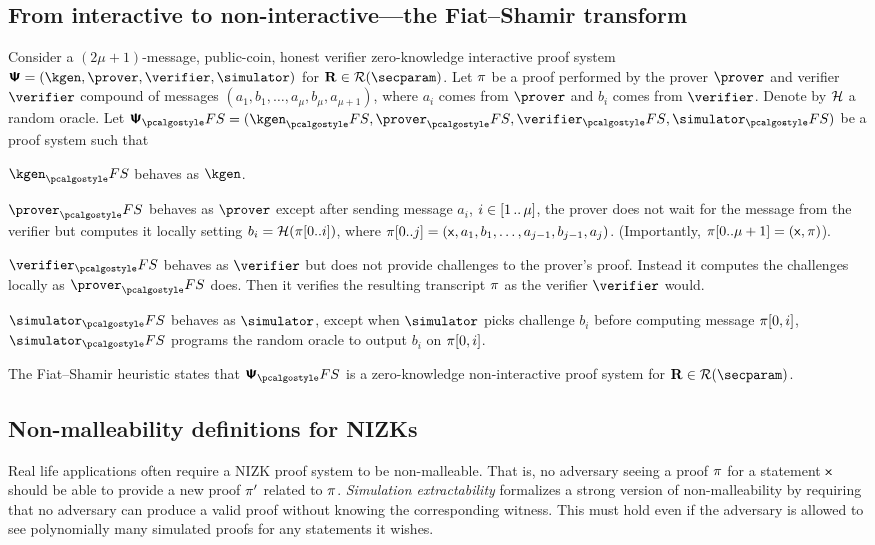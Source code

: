 \documentclass[runningheads,11pt]{llncs}
\begin{document}
\subsection{From interactive to non-interactive---the Fiat--Shamir transform}
Consider a $(2\mu + 1)$-message, public-coin, honest verifier zero-knowledge
interactive proof system
$\proofsystem = (\kgen, \prover, \verifier, \simulator)$ for
$\REL \in \RELGEN(\secparam)$.  Let $\pi$ be a proof performed by the
prover $\prover$ and verifier $\verifier$ compound of messages
$(a_1, b_1, \ldots, a_{\mu}, b_{\mu}, a_{\mu + 1})$, where $a_i$ comes from
$\prover$ and $b_i$ comes from $\verifier$.  Denote by $\mathcal{H}$ a random oracle.
Let $\proofsystem_\fs = (\kgen_\fs, \prover_\fs, \verifier_\fs, \simulator_\fs)$
be a proof system such that
\begin{compactitem}
  \item $\kgen_\fs$ behaves as $\kgen$.
  \item $\prover_\fs$ behaves as $\prover$ except after sending message
    $a_i$, $i \in [1 \, .. \, \mu]$, the prover does not wait for
    the message from the verifier but computes it locally setting $b_i
    = \mathcal{H}(\pi[0..i])$, where $\pi[0..j] = (\mathsf{x}, a_1, b_1, \ldots,
    a_{j - 1}, b_{j - 1}, a_j)$. (Importantly, $\pi[0..\mu + 1] =
    (\mathsf{x}, \pi)$).
  \item $\verifier_\fs$ behaves as $\verifier$ but does not provide
    challenges to the prover's proof. Instead it computes the
    challenges locally as $\prover_\fs$ does. Then it verifies the
    resulting transcript $\pi$ as the verifier $\verifier$ would. 
  \item $\simulator_\fs$ behaves as $\simulator$, except when
    $\simulator$ picks challenge $b_i$ before computing message $\pi[0, i]$, $\simulator_\fs$ programs the
    random oracle to output $b_i$ on $\pi[0, i]$.
  \end{compactitem}

\noindent
The Fiat--Shamir heuristic states that $\proofsystem_\fs$ is a zero-knowledge
non-interactive proof system for $\REL \in \RELGEN(\secparam)$.

\subsection{Non-malleability definitions for NIZKs}
\label{sec:simext_def}
Real life applications often require a NIZK proof system to be
non-malleable. That is, no adversary seeing a proof $\pi$ for a statement
$\mathsf{x}$ should be able to provide a new proof $\pi'$ related to $\pi$.
\emph{Simulation extractability} formalizes a strong version of non-malleability
by requiring that no adversary can produce a valid proof without knowing the
corresponding witness. This must hold even if the adversary is allowed to see
polynomially many simulated proofs for any statements it wishes.
\end{document}
